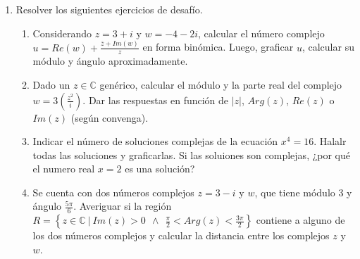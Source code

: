 \documentclass[a4paper]{article}
\newcommand{\exercise}{\item}
\newcommand{\df}[2]{\displaystyle\frac{#1}{#2}}
\newcommand{\conj}[1]{\overline{#1}}
\begin{document}
\begin{enumerate}
	\begin{enumerate} [label=(\alph*)]
		\item En la mecánica cuántica, la amplitud de probabilidad a menudo se da como un número complejo. Si la amplitud de un estado cuántico está dada por $\psi=\df{1}{\sqrt{3}}+\df{i}{\sqrt{6}}$, calcula la probabilidad de dicho estado cuántico con la ecuación $P=\psi .\conj{\psi}$.
		\item Un circuito se describe por una impedancia $Z=4+3i$ ohmios y una corriente alterna con fasor $I=2.e^{\frac{\pi}{6}}$ amperios. Encuentra la representación en fasor del voltaje  $V$ a travès de la ecuación $V=Z.I$, ya sea en su forma binómica o exponencial.
		\item En la ingeniería eléctrica, al analizar circuitos electrónicos, a menudo nos encontramos con parámetros conocido como "polos". Estos polos son fundamentales para determinar la estabilidad de un circuito. \\ Reglas: Si todos los polos tienen una parte real negativa, el circuito es estable. Si algún polo tiene una parte real positiva, el circuito es inestable. Si un par de polos se encuentran exactamente en el eje imaginario (parte real es cero), el circuito es marginalente estable. \\ Problema: Dado un circuito eléctrico que tiene tres polos: $P_1=5+2i$, $P_2=0+3i$ y $P_3=0-3i$, clasifica el circuito en estable, inestable inestable o marginalmente estable.
	\end{enumerate}
	\exercise Resolver los siguientes ejercicios de desafío. 
	\begin{enumerate} [label=(\alph*)]
		\item Considerando $z=3+i$ y $w=-4-2i$, calcular el número complejo $u=Re(w)+\df{\conj{z}+Im(w)}{z}$ en forma binómica. Luego, graficar $u$, calcular su módulo y ángulo aproximadamente.
		\item Dado un $z \in \mathbb{C}$ genérico, calcular el módulo y la parte real del complejo $w=3\left(\df{z^2}{i}\right)$. Dar las respuestas en función de $|z|$, $Arg(z)$, $Re(z)$ o $Im(z)$ (según convenga).
		\item Indicar el número de soluciones complejas de la ecuación $x^4=16$. Halalr todas las soluciones y graficarlas. Si las soluiones son complejas, ¿por qué el numero real $x=2$ es una solución?
		\item Se cuenta con dos números complejos $z=3-i$ y $w$, que tiene módulo 3 y ángulo $\df{5\pi}{6}$. Averiguar si la región $R=\left\{z\in\mathbb{C} ~|~ Im(z)>0 ~~\land~~ \df{\pi}{2}<Arg(z)<\df{3\pi}{2}\right\}$ contiene a alguno de los dos números complejos y calcular la distancia entre los complejos $z$ y $w$.

\end{enumerate}
\end{enumerate}
\end{document}
